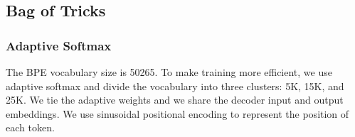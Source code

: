 \subsection{Bag of Tricks}

\subsubsection{Adaptive Softmax}

The BPE vocabulary size is 50265. To make training more efficient, we use adaptive softmax
\cite{Grave2016EfficientSA} and divide the vocabulary into three clusters: 5K,
15K, and 25K. We tie the adaptive weights and we share the decoder input and
output embeddings. We use sinusoidal positional encoding
\cite{Vaswani2017AttentionIA} to represent the position of each token.
